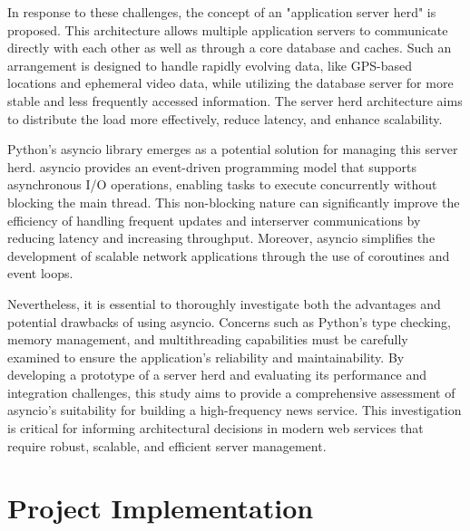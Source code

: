 \documentclass[letterpaper,twocolumn,10pt]{article}
\begin{document}
\noindent{}In response to these challenges, the concept of an "application server herd" is proposed. This architecture allows multiple application servers to communicate directly with each other as well as through a core database and caches. Such an arrangement is designed to handle rapidly evolving data, like GPS-based locations and ephemeral video data, while utilizing the database server for more stable and less frequently accessed information. The server herd architecture aims to distribute the load more effectively, reduce latency, and enhance scalability.
\vspace{5pt}

\noindent{}Python's asyncio library emerges as a potential solution for managing this server herd. asyncio provides an event-driven programming model that supports asynchronous I/O operations, enabling tasks to execute concurrently without blocking the main thread. This non-blocking nature can significantly improve the efficiency of handling frequent updates and interserver communications by reducing latency and increasing throughput. Moreover, asyncio simplifies the development of scalable network applications through the use of coroutines and event loops.
\vspace{5pt}

\noindent{}Nevertheless, it is essential to thoroughly investigate both the advantages and potential drawbacks of using asyncio. Concerns such as Python's type checking, memory management, and multithreading capabilities must be carefully examined to ensure the application's reliability and maintainability. By developing a prototype of a server herd and evaluating its performance and integration challenges, this study aims to provide a comprehensive assessment of asyncio's suitability for building a high-frequency news service. This investigation is critical for informing architectural decisions in modern web services that require robust, scalable, and efficient server management.

\section{Project Implementation}
\end{document}
